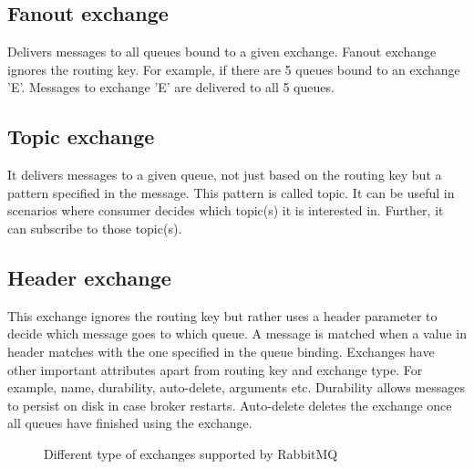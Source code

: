 \documentclass[9pt,twocolumn,twoside]{../../styles/osajnl}
\begin{document}
\subsection{Fanout exchange}
Delivers messages to all queues bound to a given exchange. Fanout exchange
ignores the routing key. For example, if there are 5 queues bound to an exchange
'E'.  Messages to exchange 'E' are delivered to all 5 queues.

\subsection{Topic exchange}
It delivers messages to a given queue, not just based on the routing key but a
pattern specified in the message. This pattern is called topic. It can be useful
in scenarios where consumer decides which topic(s) it is interested in.
Further, it can subscribe to those topic(s).

\subsection{Header exchange}
This exchange ignores the routing key but rather uses a header parameter to
decide which message goes to which queue. A message is matched when a value in
header matches with the one specified in the queue binding. Exchanges have other
important attributes apart from routing key and exchange type. For example,
name, durability, auto-delete, arguments etc. Durability allows messages to
persist on disk in case broker restarts. Auto-delete deletes the exchange once
all queues have finished using the exchange.

\begin{figure}[htbp]
\centering
{}
\caption{Different type of exchanges supported by
RabbitMQ\cite{www-rabbitmq-Johan}}
\label{fig:false-color}
\end{figure}
\end{document}
